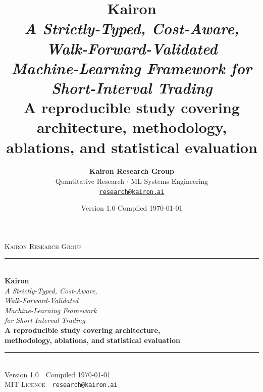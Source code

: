 \documentclass[11pt,a4paper]{article}
\title{\vspace{-1.5em}%
\Huge\textbf{Kairon}\\[0.3em]
\large\textit{A Strictly-Typed, Cost-Aware, Walk-Forward-Validated\\
Machine-Learning Framework for Short-Interval Trading}\\[1.0em]
\normalsize A reproducible study covering architecture, methodology,\\
ablations, and statistical evaluation}
\author{
    \large\textbf{Kairon Research Group}\\[0.4em]
    \normalsize Quantitative Research $\cdot$ ML Systems Engineering\\[0.2em]
    \texttt{\href{mailto:research@kairon.ai}{research@kairon.ai}}
}
\date{\small Version 1.0 \;\textbar\; Compiled \today}
\begin{document}
\begin{titlepage}
\thispagestyle{empty}
\begin{center}
\vspace*{1.5cm}

{\Large\textsc{Kairon Research Group}}\\[1.2em]
\rule{0.55\linewidth}{0.6pt}\\[2.0em]

{\Huge\bfseries Kairon}\\[0.7em]
{\LARGE\itshape A Strictly-Typed, Cost-Aware,\\
Walk-Forward-Validated\\[0.3em]
Machine-Learning Framework\\
for Short-Interval Trading}\\[1.5em]

{\large\bfseries A reproducible study covering architecture,\\
methodology, ablations, and statistical evaluation}\\[3.0em]

\rule{0.55\linewidth}{0.6pt}\\[1.5em]

{\large Version 1.0 \,\textbar\, Compiled \today}\\[0.4em]
{\small\textsc{MIT Licence} \,\textbar\, \texttt{research@kairon.ai}}
\end{center}
\end{titlepage}
\end{document}
